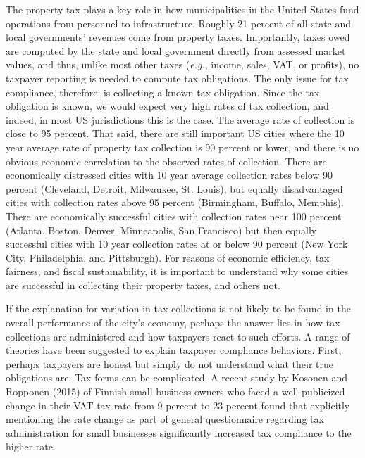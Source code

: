 \documentclass[12pt,titlepage]{article}
\begin{document}
The property tax plays a key role in how municipalities in the
United States fund operations from personnel to infrastructure.
Roughly 21 percent of all state and local governments’ revenues
come from property taxes.  Importantly, taxes owed are computed
by the state and local government directly from assessed market
values, and thus, unlike most other taxes (\textit{e.g.}, income, sales,
VAT, or profits), no taxpayer reporting is needed to compute tax
obligations.  The only issue for tax compliance, therefore, is
collecting a known tax obligation.  Since the tax obligation is
known, we would expect very high rates of tax collection, and
indeed, in most US jurisdictions this is the case.  The average
rate of collection is close to 95 percent.  That said, there are
still important US cities where the 10 year average rate of property
tax collection is 90 percent or lower, and there is no obvious
economic correlation to the observed rates of collection.  There
are economically distressed cities with 10 year average collection
rates below 90 percent (Cleveland, Detroit, Milwaukee, St. Louis),
but equally disadvantaged cities with collection rates above 95
percent (Birmingham, Buffalo, Memphis).   There are economically
successful cities with collection rates near 100 percent (Atlanta,
Boston, Denver, Minneapolis,  San Francisco) but then equally
successful cities with 10 year collection rates at or below 90
percent (New York City, Philadelphia, and Pittsburgh). For
reasons of economic efficiency, tax fairness, and fiscal
sustainability, it is important to understand why some cities are
successful in collecting their property taxes, and others not.  

If the explanation for variation in tax collections is not likely
to be found in the overall performance of the city’s economy,
perhaps the answer lies in how tax collections are administered
and how taxpayers react to such efforts. A range of theories
have been suggested to explain taxpayer compliance behaviors. 
First, perhaps taxpayers are honest but simply do not understand
what their true obligations are. Tax forms can be complicated. 
A recent study by Kosonen and Ropponen (2015) of Finnish small
business owners who faced a well-publicized change in their VAT
tax rate from 9 percent to 23 percent found that explicitly
mentioning the rate change as part of general questionnaire
regarding tax administration for small businesses significantly
increased tax compliance to the higher rate. 
\end{document}

